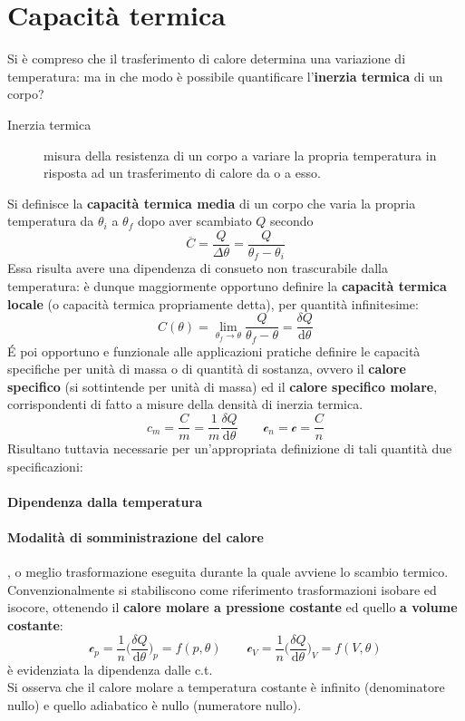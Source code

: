\documentclass[10pt, oneside]{book}
\begin{document}
\section{Capacità termica}
Si è compreso che il trasferimento di calore determina una variazione di temperatura: ma in che modo è possibile quantificare l'\textbf{inerzia termica} di un corpo?
\begin{description}
\item[Inerzia termica] misura della resistenza di un corpo a variare la propria temperatura in risposta ad un trasferimento di calore da o a esso.
\end{description}
Si definisce la \textbf{capacità termica media} di un corpo che varia la propria temperatura da $\theta_i$ a $\theta_f$ dopo aver scambiato $Q$ secondo
\[\overline{C} = \frac{Q}{\Delta \theta} = \frac{Q}{\theta_f - \theta_i}\]
Essa risulta avere una dipendenza di consueto non trascurabile dalla temperatura: è dunque maggiormente opportuno definire la \textbf{capacità termica locale} (o capacità termica propriamente detta), per quantità infinitesime:
\[C(\theta) = \lim\limits_{\theta_f \rightarrow \theta}\frac{Q}{\theta_f - \theta} = \frac{\delta Q}{\mathrm{d}\theta}\]
\'E poi opportuno e funzionale alle applicazioni pratiche definire le capacità specifiche per unità di massa o di quantità di sostanza, ovvero il \textbf{calore specifico} (si sottintende per unità di massa) ed il \textbf{calore specifico molare}, corrispondenti di fatto a misure della densità di inerzia termica.
\[c_m = \frac{C}{m} = \frac{1}{m} \frac{\delta Q}{\mathrm{d}\theta} \quad \quad \mathcal{c}_n = \mathcal{c} = \frac{C}{n}\]
Risultano tuttavia necessarie per un'appropriata definizione di tali quantità due specificazioni:
\paragraph{Dipendenza dalla temperatura}
\paragraph{Modalità di somministrazione del calore}, o meglio trasformazione eseguita durante la quale avviene lo scambio termico. Convenzionalmente si stabiliscono come riferimento trasformazioni isobare ed isocore, ottenendo il \textbf{calore molare a pressione costante} ed quello \textbf{a volume costante}:
\[\mathcal{c}_p = \frac{1}{n} \bigg(\frac{\delta Q}{\mathrm{d}\theta}\bigg)_p = f(p, \theta) \quad \quad \mathcal{c}_V = \frac{1}{n} \bigg(\frac{\delta Q}{\mathrm{d}\theta}\bigg)_V = f(V, \theta)\]
è evidenziata la dipendenza dalle c.t.\\Si osserva che il calore molare a temperatura costante è infinito (denominatore nullo) e quello adiabatico è nullo (numeratore nullo).
\end{document}
